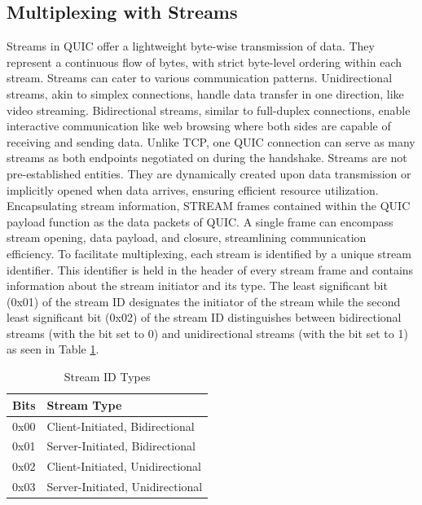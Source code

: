 \subsection{Multiplexing with Streams} \label{multiplexing_w_streams}

Streams in QUIC offer a lightweight byte-wise transmission of data. They represent a continuous flow of bytes, with strict byte-level
ordering within each stream. Streams can cater to various communication patterns. Unidirectional streams, akin to simplex connections,
handle data transfer in one direction, like video streaming. Bidirectional streams, similar to full-duplex connections, enable
interactive communication like web browsing where both sides are capable of receiving and sending data. Unlike TCP, one QUIC
connection can serve as many streams as both endpoints negotiated on during the handshake. Streams are not pre-established entities.
They are dynamically created upon data transmission or implicitly opened when data arrives, ensuring efficient resource utilization.
Encapsulating stream information, STREAM frames contained within the QUIC payload function as the data packets of QUIC. A single
frame can encompass stream opening, data payload, and closure, streamlining communication efficiency. To facilitate multiplexing,
each stream is identified by a unique stream identifier. This identifier is held in the header of every stream frame and contains
information about the stream initiator and its type. The least significant bit (0x01) of the stream ID designates the initiator of
the stream while the second least significant bit (0x02) of the stream ID distinguishes between bidirectional streams (with the bit
set to 0) and unidirectional streams (with the bit set to 1) as seen in Table \ref{table_stream_id_types}.

\begin{table}[H]
\begin{center}
    \begin{tabular}{| l | l |}
    \hline
    Bits & Stream Type \\ \hline
    0x00 & Client-Initiated, Bidirectional \\ \hline
    0x01 & Server-Initiated, Bidirectional \\ \hline
    0x02 & Client-Initiated, Unidirectional \\ \hline
    0x03 & Server-Initiated, Unidirectional \\ \hline
    \end{tabular}
\end{center}
\caption{Stream ID Types \cite[Tab. 1]{rfc9000}}
\label{table_stream_id_types}
\end{table}

